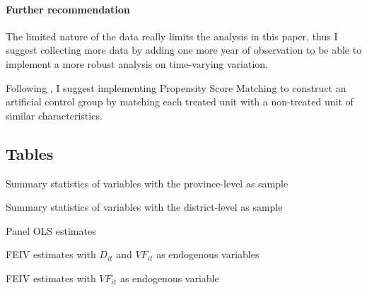 \documentclass[letterpaper,12pt,leqno]{article}
\newcommand{\bib}{bibliography.bib}
\begin{document}
\paragraph{Further recommendation}
The limited nature of the data really limits the analysis in this paper, thus I suggest collecting more data by adding one more year of observation to be able to implement a more robust analysis on time-varying variation.

Following \citet{abadie2016}, I suggest implementing Propensity Score Matching to construct an artificial control group by matching each treated unit with a non-treated unit of similar characteristics.



\newpage
\appendix
\begin{landscape}
\section{Tables}\label{a:table}

\begin{table}[h]
\caption{Summary statistics of variables with the province-level as sample} 
\scalebox{0.85}{}
\label{t:1}\end{table}


\begin{table}[h]
\caption{Summary statistics of variables with the district-level as sample} 
\scalebox{0.85}{}
\label{t:2}\end{table}

\end{landscape}

\begin{table}[h]
\caption{Panel OLS estimates} 
\scalebox{0.85}{}
\label{t:pols}\end{table}

\begin{table}[h]
\caption{FEIV estimates with $D_{it}$ and $VF_{it}$ as endogenous variables}
\scalebox{0.8}{}    
\label{t:FEIV}
\end{table}

\begin{table}[h]
\caption{FEIV estimates with $VF_{it}$ as endogenous variable}
\scalebox{0.8}{}    
\label{t:FEIV1}
\end{table}
\end{document}
